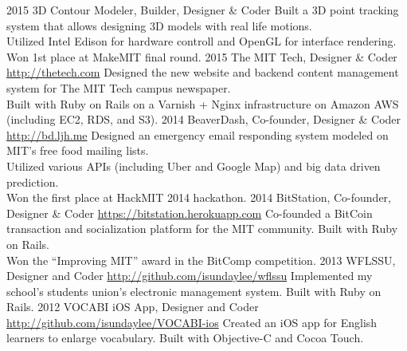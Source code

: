 \documentclass[__VERSION__]{friggeri-cv} %
\begin{document}
\begin{entrylist}
  \entry
  {2015}
  {3D Contour Modeler, Builder, Designer \& Coder}
  {}
  {Built a 3D point tracking system that allows designing 3D models with real life motions. \\
  Utilized Intel Edison for hardware controll and OpenGL for interface rendering. \\
  Won 1st place at MakeMIT final round. }
  \entry
  {2015}
  {The MIT Tech, Designer \& Coder}
  {\href{http://thetech.com}{http://thetech.com}}
  {Designed the new website and backend content management system for The MIT Tech campus newspaper. \\
  Built with Ruby on Rails on a Varnish + Nginx infrastructure on Amazon AWS (including EC2, RDS, and S3). }
  \entry
  {2014}
  {BeaverDash, Co-founder, Designer \& Coder}
  {\href{http://bd.ljh.me}{http://bd.ljh.me}}
  {Designed an emergency email responding system modeled on MIT's free food mailing lists. \\
  Utilized various APIs (including Uber and Google Map) and big data driven prediction. \\
  Won the first place at HackMIT 2014 hackathon. }
  \entry
  {2014}
  {BitStation, Co-founder, Designer \& Coder}
  {\href{https://bitstation.herokuapp.com}{https://bitstation.herokuapp.com}}
  {Co-founded a BitCoin transaction and socialization platform for the MIT community. Built with Ruby on Rails. \\
  Won the ``Improving MIT'' award in the BitComp competition. }
  \entry
  {2013}
  {WFLSSU, Designer and Coder}
  {\href{http://github.com/isundaylee/wflssu}{http://github.com/isundaylee/wflssu}}
  {Implemented my school's students union's electronic management system. Built with Ruby on Rails.}
  \entry
  {2012}
  {VOCABI iOS App, Designer and Coder}
  {\href{http://github.com/isundaylee/VOCABI-ios}{http://github.com/isundaylee/VOCABI-ios}}
  {Created an iOS app for English learners to enlarge vocabulary. Built with Objective-C and Cocoa Touch.}
\end{entrylist}
\end{document}
